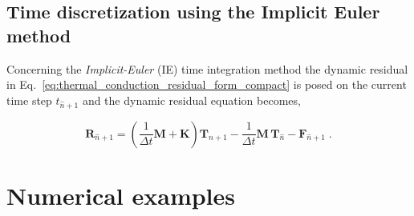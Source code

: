 \documentclass[10pt,a4paper]{article}
\begin{document}
\subsection{Time discretization using the Implicit Euler method}\label{subsec:time_discretization_ie}

Concerning the \textit{Implicit-Euler} (IE) time integration method the dynamic residual in Eq.~\eqref{eq:thermal_conduction_residual_form_compact} is posed on the current time step $t_{\hat{n} + 1}$ and the dynamic residual equation becomes,

\begin{equation}
	\mathbf{R}_{\hat{n} + 1} = \left( \frac{1}{\Delta t} \mathbf{M} + \mathbf{K} \right)\mathbf{T}_{\hat{n} + 1} - \frac{1}{\Delta t} \mathbf{M} \, \mathbf{T}_{\hat{n}} - \mathbf{F}_{\hat{n} + 1} \;. \label{eq:dynamic_residual_ie}
\end{equation}

\section{Numerical examples}\label{subsec:numerical_examples}


% 


\nocite{*}
\end{document}
